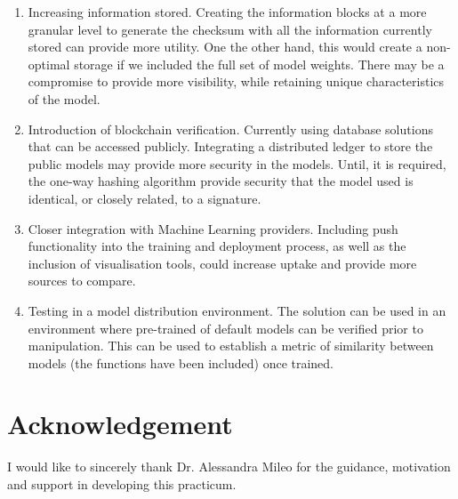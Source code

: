 \begin{enumerate}
    \item 
    Increasing information stored. 
    Creating the information blocks at a more granular level to generate the checksum with all the information currently stored can provide more utility. One the other hand, this would create a non-optimal storage if we included the full set of model weights. There may be a compromise to provide more visibility, while retaining unique characteristics of the model.
    
    \item 
    Introduction of blockchain verification.
    Currently using database solutions that can be accessed publicly. Integrating a distributed ledger to store the public models may provide more security in the models. Until, it is required, the one-way hashing algorithm provide security that the model used is identical, or closely related, to a signature.
    
    \item 
    Closer integration with Machine Learning providers.
    Including push functionality into the training and deployment process, as well as the inclusion of visualisation tools, could increase uptake and provide more sources to compare.
    
    \item 
    Testing in a model distribution environment.
    The solution can be used in an environment where pre-trained of default models can be verified prior to manipulation. This can be used to establish a metric of similarity between models (the functions have been included) once trained.
\end{enumerate}


\section{Acknowledgement}

I would like to sincerely thank Dr. Alessandra Mileo for the guidance, motivation and support in developing this practicum.